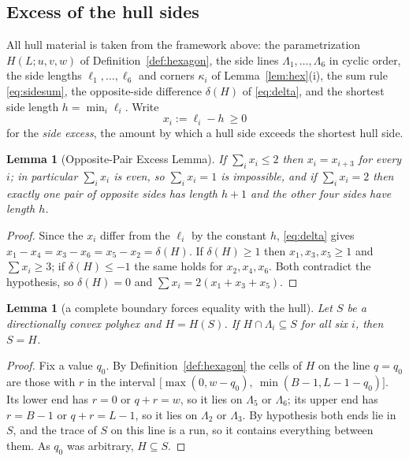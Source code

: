 \documentclass[11pt]{article}
\theoremstyle{plain}
\newtheorem{lemma}[theorem]{Lemma}
\theoremstyle{definition}
\theoremstyle{remark}
\begin{document}
\subsection{Excess of the hull sides}\label{sec:12.2}

All hull material is taken from the framework above: the parametrization \(H(L;u,v,w)\) of
Definition~\ref{def:hexagon}, the side lines \(\Lambda_{1},\dots,\Lambda_{6}\) in cyclic
order, the side lengths \(\ell_{1},\dots,\ell_{6}\) and corners \(\kappa_{i}\) of
Lemma~\ref{lem:hex}(i), the sum rule \eqref{eq:sidesum}, the opposite-side difference
\(\delta(H)\) of \eqref{eq:delta}, and the shortest side length \(h=\min_{i}\ell_{i}\).
Write
\[
   x_{i}:=\ell_{i}-h\ \ge0
\]
for the \emph{side excess}, the amount by which a hull side exceeds the shortest hull side.


\begin{lemma}[Opposite-Pair Excess Lemma]\label{lem:oppair}
If \(\sum_{i}x_{i}\le2\) then \(x_{i}=x_{i+3}\) for every \(i\); in particular
\(\sum_{i}x_{i}\) is even, so \(\sum_{i}x_{i}=1\) is impossible, and if
\(\sum_{i}x_{i}=2\) then exactly one pair of opposite sides has length \(h+1\) and the other
four sides have length \(h\).
\end{lemma}

\begin{proof}
Since the \(x_{i}\) differ from the \(\ell_{i}\) by the constant \(h\), \eqref{eq:delta}
gives \(x_{1}-x_{4}=x_{3}-x_{6}=x_{5}-x_{2}=\delta(H)\). If \(\delta(H)\ge1\) then
\(x_{1},x_{3},x_{5}\ge1\) and \(\sum x_{i}\ge3\); if \(\delta(H)\le-1\) the same holds for
\(x_{2},x_{4},x_{6}\). Both contradict the hypothesis, so \(\delta(H)=0\) and
\(\sum x_{i}=2(x_{1}+x_{3}+x_{5})\).
\end{proof}

\begin{lemma}[a complete boundary forces equality with the hull]\label{lem:complete}
Let \(S\) be a directionally convex polyhex and \(H=H(S)\). If \(H\cap\Lambda_{i}\subseteq S\)
for all six \(i\), then \(S=H\).
\end{lemma}

\begin{proof}
Fix a value \(q_{0}\). By Definition~\ref{def:hexagon} the cells of \(H\) on the line
\(q=q_{0}\) are those with \(r\) in the interval
\(\bigl[\max(0,w-q_{0}),\ \min(B-1,L-1-q_{0})\bigr]\). Its lower end has \(r=0\) or
\(q+r=w\), so it lies on \(\Lambda_{5}\) or \(\Lambda_{6}\); its upper end has \(r=B-1\) or
\(q+r=L-1\), so it lies on \(\Lambda_{2}\) or \(\Lambda_{3}\). By hypothesis both ends lie
in \(S\), and the trace of \(S\) on this line is a run, so it contains everything between
them. As \(q_{0}\) was arbitrary, \(H\subseteq S\).
\end{proof}
\end{document}
